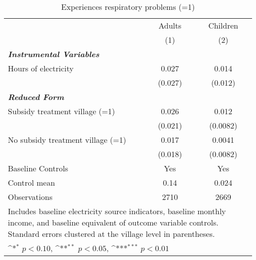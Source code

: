 
\begin{table}[htbp]\centering
\def\sym#1{\ifmmode^{#1}\else\(^{#1}\)\fi}
\caption{Experiences respiratory problems (=1)}

\begin{tabular}{l*{2}{c}}
\toprule
& Adults & Children \\
& (1) & (2) \\ \hline
\textbf{\emph{Instrumental Variables}}&         &         \\
Hours of electricity&    0.027         &    0.014         \\
                &  (0.027)         &  (0.012)         \\
\textbf{\emph{Reduced Form}}&          &                  \\
Subsidy treatment village (=1)&    0.026    &  0.012       \\
                &  (0.021)         & (0.0082)         \\
No subsidy treatment village (=1)&    0.017  &   0.0041   \\
                &  (0.018)         & (0.0082)         \\
               \addlinespace
Baseline Controls &      Yes         &      Yes         \\

Control mean           &     0.14         &    0.024         \\
Observations    &     2710         &     2669         \\
\bottomrule
\multicolumn{3}{p{\textwidth}}{\footnotesize Includes baseline electricity source indicators, baseline monthly income, and baseline equivalent of outcome variable controls. Standard errors clustered at the village level in parentheses.}\\
\multicolumn{3}{p{\textwidth}}{\footnotesize \sym{*} \(p<0.10\), \sym{**} \(p<0.05\), \sym{***} \(p<0.01\)}\\
\end{tabular}\end{table}
